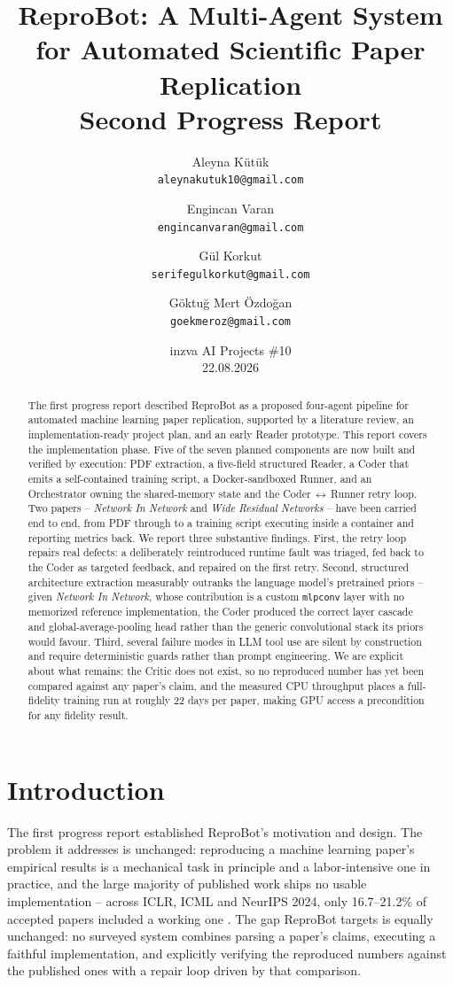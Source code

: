 \documentclass[10pt,twocolumn]{article}
\title{\textbf{ReproBot: A Multi-Agent System for Automated Scientific Paper Replication}\\[0.4em]
\large Second Progress Report}
\author{
  Aleyna Kütük \\ \small\texttt{aleynakutuk10@gmail.com}
  \and
  Engincan Varan \\ \small\texttt{engincanvaran@gmail.com}
  \and
  Gül Korkut \\ \small\texttt{serifegulkorkut@gmail.com}
  \and
  Göktuğ Mert Özdoğan \\ \small\texttt{goekmeroz@gmail.com}
}
\date{inzva AI Projects \#10 \\ 22.08.2026}
\begin{document}
\maketitle

\begin{abstract}
The first progress report described ReproBot as a proposed four-agent pipeline for
automated machine learning paper replication, supported by a literature review, an
implementation-ready project plan, and an early Reader prototype. This report covers the
implementation phase. Five of the seven planned components are now built and verified by
execution: PDF extraction, a five-field structured Reader, a Coder that emits a
self-contained training script, a Docker-sandboxed Runner, and an Orchestrator owning the
shared-memory state and the Coder\,$\leftrightarrow$\,Runner retry loop. Two papers --
\emph{Network In Network} and \emph{Wide Residual Networks} -- have been carried end to
end, from PDF through to a training script executing inside a container and reporting
metrics back. We report three substantive findings. First, the retry loop repairs real
defects: a deliberately reintroduced runtime fault was triaged, fed back to the Coder as
targeted feedback, and repaired on the first retry. Second, structured architecture
extraction measurably outranks the language model's pretrained priors -- given
\emph{Network In Network}, whose contribution is a custom \texttt{mlpconv} layer with no
memorized reference implementation, the Coder produced the correct layer cascade and
global-average-pooling head rather than the generic convolutional stack its priors would
favour. Third, several failure modes in LLM tool use are silent by construction and
require deterministic guards rather than prompt engineering. We are explicit about what
remains: the Critic does not exist, so no reproduced number has yet been compared against
any paper's claim, and the measured CPU throughput places a full-fidelity training run at
roughly 22 days per paper, making GPU access a precondition for any fidelity result.
\end{abstract}

\section{Introduction}
\label{sec:intro}

The first progress report \cite{reprobot2026first} established ReproBot's motivation and
design. The problem it addresses is unchanged: reproducing a machine learning paper's
empirical results is a mechanical task in principle and a labor-intensive one in
practice, and the large majority of published work ships no usable implementation --
across ICLR, ICML and NeurIPS 2024, only 16.7--21.2\% of accepted papers included a
working one \cite{seo2025papercoder}. The gap ReproBot targets is equally unchanged: no
surveyed system combines parsing a paper's claims, executing a faithful implementation,
and explicitly verifying the reproduced numbers against the published ones with a repair
loop driven by that comparison.
\end{document}
